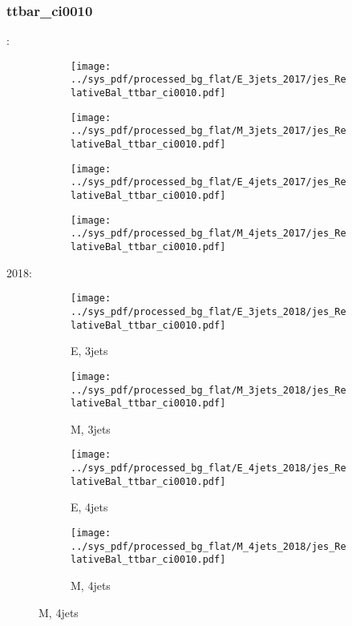 \documentclass{beamer}
\begin{document}
\begin{frame}
\frametitle{ttbar_ci0010}
\fontsize{5}{1}:
\begin{figure}
\centering
\begin{subfigure}[b]{0.24\textwidth}
\texttt{[image: ../sys\_pdf/processed\_bg\_flat/E\_3jets\_2017/jes\_RelativeBal\_ttbar\_ci0010.pdf]}
\end{subfigure}
\begin{subfigure}[b]{0.24\textwidth}
\texttt{[image: ../sys\_pdf/processed\_bg\_flat/M\_3jets\_2017/jes\_RelativeBal\_ttbar\_ci0010.pdf]}
\end{subfigure}
\begin{subfigure}[b]{0.24\textwidth}
\texttt{[image: ../sys\_pdf/processed\_bg\_flat/E\_4jets\_2017/jes\_RelativeBal\_ttbar\_ci0010.pdf]}
\end{subfigure}
\begin{subfigure}[b]{0.24\textwidth}
\texttt{[image: ../sys\_pdf/processed\_bg\_flat/M\_4jets\_2017/jes\_RelativeBal\_ttbar\_ci0010.pdf]}
\end{subfigure}
\end{figure}
2018:
\begin{figure}
\centering
\begin{subfigure}[b]{0.24\textwidth}
\texttt{[image: ../sys\_pdf/processed\_bg\_flat/E\_3jets\_2018/jes\_RelativeBal\_ttbar\_ci0010.pdf]}
\captionsetup{font=tiny}
\caption{E, 3jets}
\end{subfigure}
\begin{subfigure}[b]{0.24\textwidth}
\texttt{[image: ../sys\_pdf/processed\_bg\_flat/M\_3jets\_2018/jes\_RelativeBal\_ttbar\_ci0010.pdf]}
\captionsetup{font=tiny}
\caption{M, 3jets}
\end{subfigure}
\begin{subfigure}[b]{0.24\textwidth}
\texttt{[image: ../sys\_pdf/processed\_bg\_flat/E\_4jets\_2018/jes\_RelativeBal\_ttbar\_ci0010.pdf]}
\captionsetup{font=tiny}
\caption{E, 4jets}
\end{subfigure}
\begin{subfigure}[b]{0.24\textwidth}
\texttt{[image: ../sys\_pdf/processed\_bg\_flat/M\_4jets\_2018/jes\_RelativeBal\_ttbar\_ci0010.pdf]}
\captionsetup{font=tiny}
\caption{M, 4jets}
\end{subfigure}
\end{figure}
\end{frame}
\end{document}
